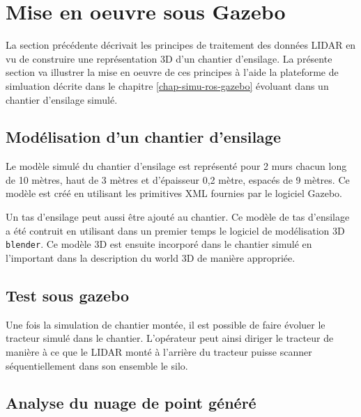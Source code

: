 \documentclass[12pt,a4paper]{report}
\begin{document}
	\section{Mise en oeuvre sous Gazebo}
	
	La section précédente décrivait les principes de traitement des données LIDAR en vu de construire une représentation 3D d'un chantier d'ensilage. La présente section va illustrer la mise en oeuvre de ces principes à l'aide la plateforme de simluation décrite dans le chapitre \ref{chap-simu-ros-gazebo} évoluant dans un chantier d'ensilage simulé.
	
		\subsection{Modélisation d'un chantier d'ensilage}
		Le modèle simulé du chantier d'ensilage est représenté pour 2 murs chacun long de 10 mètres, haut de 3 mètres et d'épaisseur 0,2 mètre, espacés de 9 mètres. Ce modèle est créé en utilisant les primitives XML fournies par le logiciel Gazebo.
		
		
		\para Un tas d'ensilage peut aussi être ajouté au chantier. Ce modèle de tas d'ensilage a été contruit en utilisant dans un premier temps le logiciel de modélisation 3D \verb|blender|. Ce modèle 3D est ensuite incorporé dans le chantier simulé en l'important dans la description du world 3D de manière appropriée.
		
		
	
	
		\subsection{Test sous gazebo}
		Une fois la simulation de chantier montée, il est possible de faire évoluer le tracteur simulé dans le chantier. L'opérateur peut ainsi diriger le tracteur de manière à ce que le LIDAR monté à l'arrière du tracteur puisse scanner séquentiellement dans son ensemble le silo.
		

		
		\subsection{Analyse du nuage de point généré}
\end{document}

